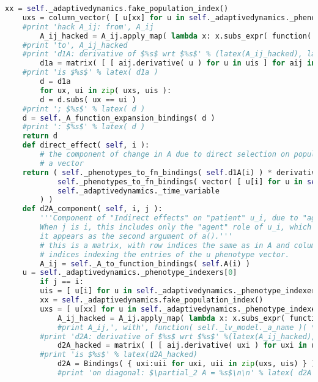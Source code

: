 \begin{lstlisting}[language=Python]
	xx = self._adaptivedynamics.fake_population_index()
	uxs = column_vector( [ u[xx] for u in self._adaptivedynamics._phenotype_indexers ] )
	#print 'hack A_ij: from', A_ij
        A_ij_hacked = A_ij.apply_map( lambda x: x.subs_expr( function( str( self._a_name_indexer[i][i] ) )(*(list(uis)+list(uis))) == function( str( self._a_name_indexer[i][i] ) )(*(list(uis)+list(uxs))) ) )
	#print 'to', A_ij_hacked
	#print 'd1A: derivative of $%s$ wrt $%s$' % (latex(A_ij_hacked), latex(uis))
        d1a = matrix( [ [ aij.derivative( u ) for u in uis ] for aij in A_ij_hacked ] )
	#print 'is $%s$' % latex( d1a )
        d = d1a
        for ux, ui in zip( uxs, uis ):
	    d = d.subs( ux == ui )
	#print '; $%s$' % latex( d )
	d = self._A_function_expansion_bindings( d )
	#print ': $%s$' % latex( d )
	return d
    def direct_effect( self, i ):
        # the component of change in A due to direct selection on population i
        # a vector
	return ( self._phenotypes_to_fn_bindings( self.d1A(i) ) * derivative(
	        self._phenotypes_to_fn_bindings( vector( [ u[i] for u in self._adaptivedynamics._phenotype_indexers ] ) ),
	        self._adaptivedynamics._time_variable
	    ) )
    def d2A_component( self, i, j ):
        '''Component of "Indirect effects" on "patient" u_i, due to "agent" u_j.
        When j is i, this includes only the "agent" role of u_i, which is where
        it appears as the second argument of a().'''
        # this is a matrix, with row indices the same as in A and column
        # indices indexing the entries of the u phenotype vector.
        A_ij = self._A_to_function_bindings( self.A(i) )
	u = self._adaptivedynamics._phenotype_indexers[0]
        if j == i:
	    uis = [ u[i] for u in self._adaptivedynamics._phenotype_indexers ]
	    xx = self._adaptivedynamics.fake_population_index()
	    uxs = [ u[xx] for u in self._adaptivedynamics._phenotype_indexers ]
            A_ij_hacked = A_ij.apply_map( lambda x: x.subs_expr( function( str( self._a_name_indexer[i][i] ) )( *(uis+uis) ) == function( str( self._a_name_indexer[i][i] ) )( *(uis+uxs) ) ) )
            #print A_ij,', with', function( self._lv_model._a_name )( *(uis+uis) ), ' => ', function( self._lv_model._a_name )( *(uis+uxs) ), ' == ', A_ij_hacked
	    #print 'd2A: derivative of $%s$ wrt $%s$' %(latex(A_ij_hacked), latex(uxs))
            d2A_hacked = matrix( [ [ aij.derivative( uxi ) for uxi in uxs ] for aij in A_ij_hacked ] )
	    #print 'is $%s$' % latex(d2A_hacked)
            d2A = Bindings( { uxi:uii for uxi, uii in zip(uxs, uis) } )( d2A_hacked )
            #print 'on diagonal: $\partial_2 A = %s$\n\n' % latex( d2A )

\end{lstlisting}
